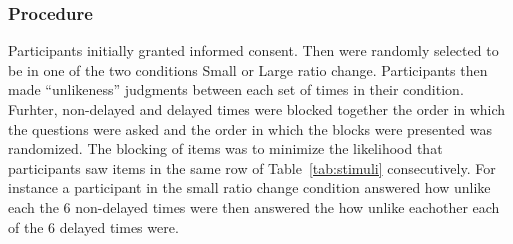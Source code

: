 \documentclass[]{article}
\begin{document}

\subsubsection{Procedure}

Participants initially granted informed consent. 
Then were randomly selected to be in one of the two conditions Small or Large ratio change. 
Participants then made ``unlikeness'' judgments between each set of times in their condition. 
Furhter, non-delayed and delayed times were blocked together the order in which the questions were asked and the order in which the blocks were presented was randomized. 
The blocking of items was to minimize the likelihood that participants saw items in the same row of Table~\ref{tab:stimuli} consecutively. 
For instance a participant in the small ratio change condition answered how unlike each  the 6 non-delayed times were then answered the how unlike eachother each of the 6 delayed times were. 
\end{document}
